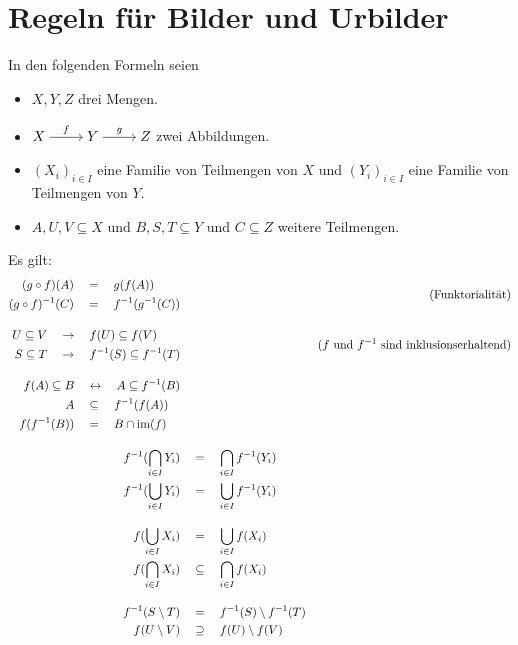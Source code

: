 \section{Regeln für Bilder und Urbilder}
In den folgenden Formeln seien
\begin{itemize}
    \item $X,Y,Z$ drei Mengen.
    \item $\begin{tikzcd}[cramped] X \ar[r, "f"] &  Y\ar[r, "g"] & Z \end{tikzcd}$ zwei Abbildungen.
    \item $(X_i)_{i\in I}$ eine Familie von Teilmengen von $X$ und $(Y_i)_{i\in I}$ eine Familie von Teilmengen von $Y$.
    \item $A,U,V\subseteq X$ und $B,S,T\subseteq Y$ und $C\subseteq Z$ weitere Teilmengen.
\end{itemize}
Es gilt:
\begingroup
\allowdisplaybreaks
\begin{align*}
    \begin{split}
    (g\circ f)(A) & \quad=\quad g(f(A)) \\
    (g\circ f)^{-1}(C) & \quad=\quad f^{-1}(g^{-1}(C))
    \end{split} && (\text{Funktorialität}) \\[1em]
    \begin{split}
        U\subseteq V & \quad \to\quad f(U) \subseteq f(V) \\
        S\subseteq T & \quad \to\quad f^{-1}(S)\subseteq f^{-1}(T)
    \end{split} && (\text{$f$ und $f^{-1}$ sind inklusionserhaltend}) \\[1em]
    \begin{split}
        f(A) \subseteq B & \quad \leftrightarrow\quad A \subseteq f^{-1}(B) \\
        A & \quad \subseteq\quad f^{-1}(f(A)) \\
        f(f^{-1}(B)) & \quad=\quad B\cap \operatorname{im}(f)
    \end{split} \\[1em]
    f^{-1}(\bigcap_{i \in I} Y_i) & \quad=\quad \bigcap_{i \in I} f^{-1}(Y_i) \\
    f^{-1} (\bigcup_{i \in I} Y_i) & \quad=\quad \bigcup_{i \in I} f^{-1}(Y_i) \\[1em]
    f(\bigcup_{i \in I} X_i) & \quad=\quad \bigcup_{i \in I} f(X_i) \\
    f(\bigcap_{i \in I} X_i) & \quad \subseteq\quad \bigcap_{i \in I} f(X_i) \\[1em]
    f^{-1}(S\setminus T) & \quad=\quad f^{-1}(S)\setminus f^{-1}(T) \\
    f(U\setminus V) & \quad \supseteq\quad f(U)\setminus f(V)
\end{align*}
\endgroup




